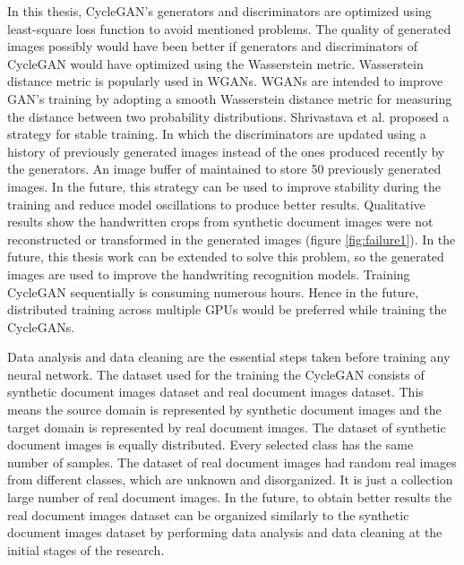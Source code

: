 In this thesis, \ac{CycleGAN}'s generators and discriminators are optimized using least-square loss function \cite{mao2017squares} to avoid mentioned problems. The quality of generated images possibly would have been better if generators and discriminators of \ac{CycleGAN} would have optimized using the Wasserstein metric. Wasserstein distance metric is popularly used in \acp{WGAN}. \acp{WGAN} are intended to improve \ac{GAN}'s training by adopting a smooth Wasserstein distance metric for measuring the distance between two probability distributions. Shrivastava et al.\cite{shrivastava2017learning} proposed a strategy for stable training. In which the discriminators are updated using a history of previously generated images instead of the ones produced recently by the generators. An image buffer of maintained to store 50 previously generated images. In the future, this strategy can be used to improve stability during the training and reduce model oscillations to produce better results. Qualitative results show the handwritten crops from synthetic document images were not reconstructed or transformed in the generated images (figure \ref{fig:failure1}). In the future, this thesis work can be extended to solve this problem, so the generated images are used to improve the handwriting recognition models. Training \ac{CycleGAN} sequentially is consuming numerous hours. Hence in the future, distributed training across multiple GPUs would be preferred while training the \acp{CycleGAN}.

Data analysis and data cleaning are the essential steps taken before training any neural network. The dataset used for the training the \ac{CycleGAN} consists of synthetic document images dataset and real document images dataset. This means the source domain is represented by synthetic document images and the target domain is represented by real document images. The dataset of synthetic document images is equally distributed. Every selected class has the same number of samples. The dataset of real document images had random real images from different classes, which are unknown and disorganized. It is just a collection large number of real document images. In the future, to obtain better results the real document images dataset can be organized similarly to the synthetic document images dataset by performing data analysis and data cleaning at the initial stages of the research.





























